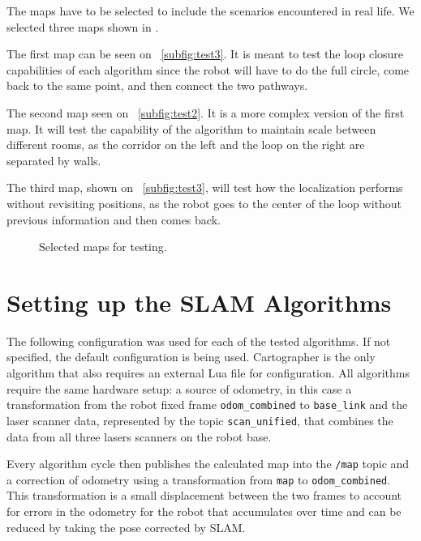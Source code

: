 The maps have to be selected to include the scenarios encountered in real life. We selected three maps shown in .

The first map can be seen on \figurename~\ref{subfig:test3}. It is meant to test the loop closure capabilities of each algorithm since the robot will have to do the full circle, come back to the same point, and then connect the two pathways.

The second map seen on \figurename~\ref{subfig:test2}. It is a more complex version of the first map. It will test the capability of the algorithm to maintain scale between different rooms, as the corridor on the left and the loop on the right are separated by walls.

The third map, shown on \figurename~\ref{subfig:test3}, will test how the localization performs without revisiting positions, as the robot goes to the center of the loop without previous information and then comes back.

\begin{figure}[!ht]
     \centering
     \caption{Selected maps for testing.}
     \label{fig:generated_maps}
\end{figure}

\section{Setting up the SLAM Algorithms}\label{sec:slam}

The following configuration was used for each of the tested algorithms. If not specified, the default configuration is being used. Cartographer is the only algorithm that also requires an external Lua file for configuration. All algorithms require the same hardware setup: a source of odometry, in this case a transformation from the robot fixed frame \texttt{odom\_combined} to \texttt{base\_link} and the laser scanner data, represented by the topic \texttt{scan\_unified}, that combines the data from all three lasers scanners on the robot base.

Every algorithm cycle then publishes the calculated map into the \texttt{/map} topic and a correction of odometry using a transformation from \texttt{map} to \texttt{odom\_combined}. This transformation is a small displacement between the two frames to account for errors in the odometry for the robot that accumulates over time and can be reduced by taking the pose corrected by SLAM.

